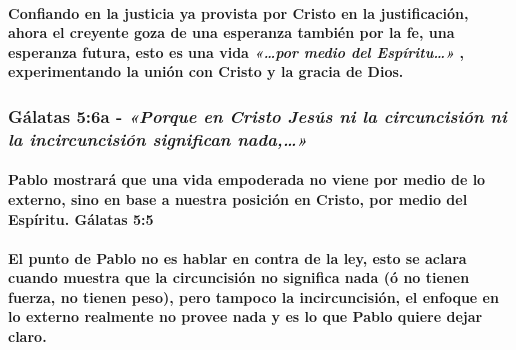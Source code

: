 \documentclass[11a pt,twoside]{article}
\newcommand{\scripture}[1]{%
  {\fontsize{12pt}{16pt}\selectfont\ScriptureFont\itshape #1}%
}
\let\oldsubsubsection\subsubsection
\renewcommand{\subsubsection}{\needspace{4\baselineskip}\oldsubsubsection}
\let\oldparagraph\paragraph
\renewcommand{\paragraph}{\needspace{3\baselineskip}\oldparagraph}
\begin{document}
\paragraph{\texorpdfstring{Confiando en la justicia ya provista por
Cristo en la justificación, ahora el creyente goza de una esperanza
también por la fe, una esperanza futura, esto es una vida
\scripture{«…por medio del Espíritu…»}, experimentando la unión con
Cristo y la gracia de
Dios.}{Confiando en la justicia ya provista por Cristo en la justificación, ahora el creyente goza de una esperanza también por la fe, una esperanza futura, esto es una vida , experimentando la unión con Cristo y la gracia de Dios.}}\label{confiando-en-la-justicia-ya-provista-por-cristo-en-la-justificaciuxf3n-ahora-el-creyente-goza-de-una-esperanza-tambiuxe9n-por-la-fe-una-esperanza-futura-esto-es-una-vida-por-medio-del-espuxedritu-experimentando-la-uniuxf3n-con-cristo-y-la-gracia-de-dios.}

\subsubsection{\texorpdfstring{Gálatas 5:6a -
\scripture{«Porque en Cristo Jesús ni la circuncisión ni la incircuncisión significan nada,…»}}{Gálatas 5:6a - }}\label{guxe1latas-56a---porque-en-cristo-jesuxfas-ni-la-circuncisiuxf3n-ni-la-incircuncisiuxf3n-significan-nada}

\paragraph{Pablo mostrará que una vida empoderada no viene por medio de
lo externo, sino en base a nuestra posición en Cristo, por medio del
Espíritu. Gálatas
5:5}\label{pablo-mostraruxe1-que-una-vida-empoderada-no-viene-por-medio-de-lo-externo-sino-en-base-a-nuestra-posiciuxf3n-en-cristo-por-medio-del-espuxedritu.-guxe1latas-55}

\paragraph{El punto de Pablo no es hablar en contra de la ley, esto se
aclara cuando muestra que la circuncisión no significa nada (ó no tienen
fuerza, no tienen peso), pero tampoco la incircuncisión, el enfoque en
lo externo realmente no provee nada y es lo que Pablo quiere dejar
claro.}\label{el-punto-de-pablo-no-es-hablar-en-contra-de-la-ley-esto-se-aclara-cuando-muestra-que-la-circuncisiuxf3n-no-significa-nada-uxf3-no-tienen-fuerza-no-tienen-peso-pero-tampoco-la-incircuncisiuxf3n-el-enfoque-en-lo-externo-realmente-no-provee-nada-y-es-lo-que-pablo-quiere-dejar-claro.}
\end{document}
